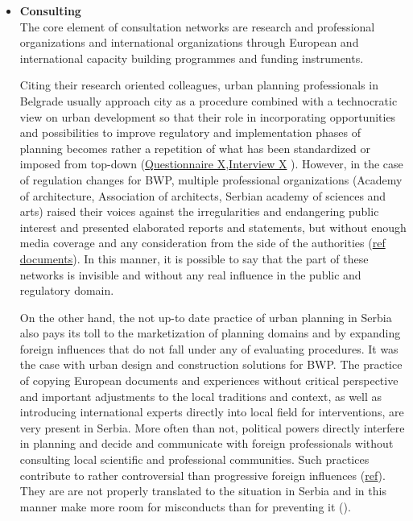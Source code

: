 \documentclass[11pt]{report}
\begin{document}
\begin{itemize}
\item \textbf{Consulting}
\\
The core element of consultation networks are research and professional organizations and international organizations through European and international capacity building programmes and funding instruments.

Citing their research oriented colleagues, urban planning professionals in Belgrade usually approach city as a procedure combined with a technocratic view on urban development so that their role in incorporating opportunities and possibilities to improve regulatory and implementation phases of planning becomes rather a repetition of what has been standardized or imposed from top-down (\href{Questionnaire Experts Savamala}{Questionnaire X},\href{InterviewX}{Interview X}
).
However, in the case of regulation changes for BWP, multiple professional organizations (Academy of architecture, Association of architects, Serbian academy of sciences and arts) raised their voices against the irregularities and endangering public interest and presented elaborated reports and statements, but without enough media coverage and any consideration from the side of the authorities (\href{ref}{ref documents}).
In this manner, it is possible to say that the part of these networks is invisible and without any real influence in the public and regulatory domain.

On the other hand, the not up-to date practice of urban planning in Serbia also pays its toll to the marketization of planning domains and by expanding foreign influences that do not fall under any of evaluating procedures.
It was the case with urban design and construction solutions for BWP.
The practice of copying European documents and experiences without critical perspective and important adjustments to the local traditions and context, as well as introducing international experts directly into local field for interventions, are very present in Serbia.
More often than not, political powers directly interfere in planning and decide and communicate with foreign professionals without consulting local scientific and professional communities.
Such practices contribute to rather controversial than progressive foreign influences (\href{ref}{ref}). They are are not properly translated to the situation in Serbia and in this manner make more room for misconducts than for preventing it (\href{ref}{\citealt{vujosevic_collapse_2010}}).
\\


\end{itemize}
\end{document}
